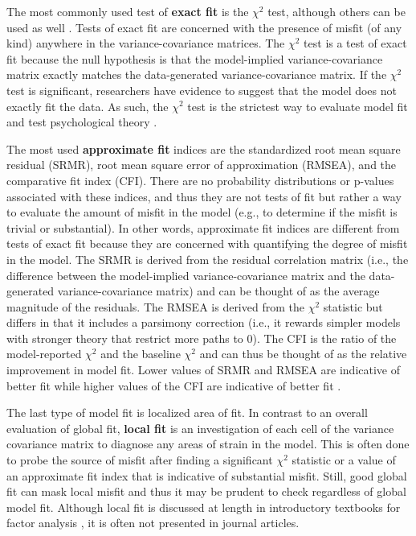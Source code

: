 \documentclass[
]{book}
\begin{document}
The most commonly used test of \textbf{exact fit} is the \({\chi}^2\) test, although others can be used as well \citep[see][]{mcneish_should_2020}. Tests of exact fit are concerned with the presence of misfit (of any kind) anywhere in the variance-covariance matrices. The \({\chi}^2\) test is a test of exact fit because the null hypothesis is that the model-implied variance-covariance matrix exactly matches the data-generated variance-covariance matrix. If the \({\chi}^2\) test is significant, researchers have evidence to suggest that the model does not exactly fit the data. As such, the \({\chi}^2\) test is the strictest way to evaluate model fit and test psychological theory \citep{hayduk_testing_2007}.

The most used \textbf{approximate fit} indices are the standardized root mean square residual (SRMR), root mean square error of approximation (RMSEA), and the comparative fit index (CFI). There are no probability distributions or p-values associated with these indices, and thus they are not tests of fit but rather a way to evaluate the amount of misfit in the model (e.g., to determine if the misfit is trivial or substantial). In other words, approximate fit indices are different from tests of exact fit because they are concerned with quantifying the degree of misfit in the model. The SRMR is derived from the residual correlation matrix (i.e., the difference between the model-implied variance-covariance matrix and the data-generated variance-covariance matrix) and can be thought of as the average magnitude of the residuals. The RMSEA is derived from the \({\chi}^2\) statistic but differs in that it includes a parsimony correction (i.e., it rewards simpler models with stronger theory that restrict more paths to 0). The CFI is the ratio of the model-reported \({\chi}^2\) and the baseline \({\chi}^2\) and can thus be thought of as the relative improvement in model fit. Lower values of SRMR and RMSEA are indicative of better fit while higher values of the CFI are indicative of better fit \citep{brown_confirmatory_2015}.

The last type of model fit is localized area of fit. In contrast to an overall evaluation of global fit, \textbf{local fit} is an investigation of each cell of the variance covariance matrix to diagnose any areas of strain in the model. This is often done to probe the source of misfit after finding a significant \({\chi}^2\) statistic or a value of an approximate fit index that is indicative of substantial misfit. Still, good global fit can mask local misfit and thus it may be prudent to check regardless of global model fit. Although local fit is discussed at length in introductory textbooks for factor analysis \citep{brown_confirmatory_2015, kline_principles_2011}, it is often not presented in journal articles.
\end{document}
